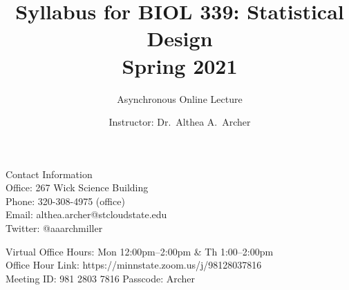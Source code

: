 \documentclass{tufte-handout}
\title{Syllabus for BIOL 339: Statistical Design \\
Spring 2021}										%
\author{Asynchronous Online Lecture}										%
\date{Instructor: Dr.~Althea A.~Archer}
\begin{document}
\maketitle

Contact Information\\
Office: 267 Wick Science Building\\
Phone: 320-308-4975 (office) \\ %
Email: althea.archer@stcloudstate.edu\\
Twitter: @aaarchmiller

\color{gray} Virtual Office Hours: Mon 12:00pm--2:00pm \& Th 1:00--2:00pm\\
Office Hour Link: https://minnstate.zoom.us/j/98128037816\\
Meeting ID: 981 2803 7816 Passcode: Archer \color{black}
\end{document}
